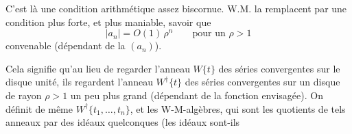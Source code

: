 \documentclass[11pt,a4paper]{article}
\begin{document}

C'est là une condition  arithmétique
assez biscornue. W.M. la remplacent par une condition plus forte, et plus
maniable, savoir que
\[
  |a_n| = O(1)\, \rho^{n} \qquad \text{pour un } \rho > 1
\]
convenable (dépendant de la  $(a_n)$).

Cela signifie qu'au lieu de regarder l'anneau $W\{t\}$ des séries
convergentes  sur le disque
unité, ils regardent l'anneau $W^{\dagger}\{t\}$ des séries convergentes
sur un disque de rayon $\rho > 1$ \struck{(\ill{} \ill{})} un peu plus grand
(dépendant de la fonction envisagée). On définit de même
$W^{\dagger}\{t_1, \ldots, t_n\}$, et les \struck{\ill{}} W-M-algèbres,
 qui sont les quotients de tels anneaux par des idéaux
 \ill{} quelconques \struck{\ill{}} (les idéaux
sont-ils
\end{document}
